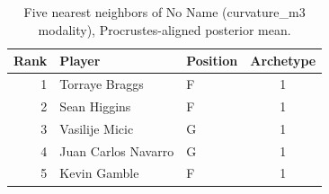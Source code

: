 \begin{table}[htbp]
  \centering\small
  \begin{tabular}{rllc}
    \toprule
    Rank & Player & Position & Archetype \\
    \midrule
    1 & Torraye Braggs & F & 1 \\
    2 & Sean Higgins & F & 1 \\
    3 & Vasilije Micic & G & 1 \\
    4 & Juan Carlos Navarro & G & 1 \\
    5 & Kevin Gamble & F & 1 \\
    \bottomrule
  \end{tabular}
  \caption{Five nearest neighbors of No Name (curvature_m3 modality), Procrustes-aligned posterior mean.}
  \label{tab:No_Name_neighbors_curvature_m3}
\end{table}

